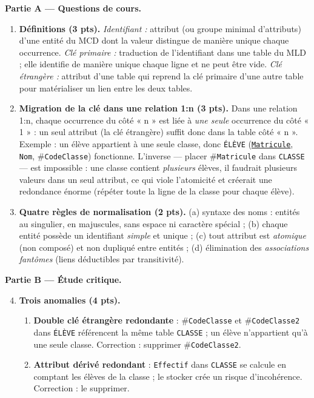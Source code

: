 \documentclass[11pt]{article}
\begin{document}
\begin{corrige}
\textbf{Partie A — Questions de cours.}
\begin{enumerate}
  \item \textbf{Définitions (3 pts).} \emph{Identifiant :} attribut (ou groupe minimal d'attributs) d'une entité du MCD dont la valeur distingue de manière unique chaque occurrence. \emph{Clé primaire :} traduction de l'identifiant dans une table du MLD ; elle identifie de manière unique chaque ligne et ne peut être vide. \emph{Clé étrangère :} attribut d'une table qui reprend la clé primaire d'une autre table pour matérialiser un lien entre les deux tables.
  \item \textbf{Migration de la clé dans une relation 1:n (3 pts).} Dans une relation 1:n, chaque occurrence du côté « n » est liée à \emph{une seule} occurrence du côté « 1 » : un seul attribut (la clé étrangère) suffit donc dans la table côté « n ». Exemple : un élève appartient à une seule classe, donc \texttt{ÉLÈVE} (\underline{\texttt{Matricule}}, \texttt{Nom}, \#\texttt{CodeClasse}) fonctionne. L'inverse — placer \#\texttt{Matricule} dans \texttt{CLASSE} — est impossible : une classe contient \emph{plusieurs} élèves, il faudrait plusieurs valeurs dans un seul attribut, ce qui viole l'atomicité et créerait une redondance énorme (répéter toute la ligne de la classe pour chaque élève).
  \item \textbf{Quatre règles de normalisation (2 pts).} (a) syntaxe des noms : entités au singulier, en majuscules, sans espace ni caractère spécial ; (b) chaque entité possède un identifiant \emph{simple} et unique ; (c) tout attribut est \emph{atomique} (non composé) et non dupliqué entre entités ; (d) élimination des \emph{associations fantômes} (liens déductibles par transitivité).
\end{enumerate}
\textbf{Partie B — Étude critique.}
\begin{enumerate}
  \setcounter{enumi}{3}
  \item \textbf{Trois anomalies (4 pts).}
  \begin{enumerate}
    \item \textbf{Double clé étrangère redondante} : \#\texttt{CodeClasse} et \#\texttt{CodeClasse2} dans \texttt{ÉLÈVE} référencent la même table \texttt{CLASSE} ; un élève n'appartient qu'à une seule classe. Correction : supprimer \#\texttt{CodeClasse2}.
    \item \textbf{Attribut dérivé redondant} : \texttt{Effectif} dans \texttt{CLASSE} se calcule en comptant les élèves de la classe ; le stocker crée un risque d'incohérence. Correction : le supprimer.

\end{enumerate}
\end{enumerate}
\end{corrige}
\end{document}
